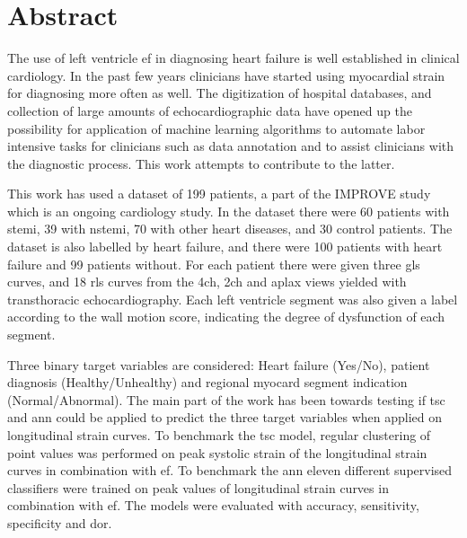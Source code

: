 \section*{Abstract}
%

The use of left ventricle \acrfull{ef} in diagnosing heart failure is well established in clinical cardiology. In the past few years clinicians have started using myocardial strain for diagnosing more often as well. The digitization of hospital databases, and collection of large amounts of echocardiographic data have opened up the possibility for application of machine learning algorithms to automate labor intensive tasks for clinicians such as data annotation and to assist clinicians with the diagnostic process. This work attempts to contribute to the latter. \bigskip

This work has used a dataset of 199 patients, a part of the IMPROVE study which is an ongoing cardiology study. In the dataset there were 60 patients with \acrlong{stemi}, 39 with \acrlong{nstemi}, 70 with other heart diseases, and 30 control patients. The dataset is also labelled by heart failure, and there were 100 patients with heart failure and 99 patients without. For each patient there were given three \acrlong{gls} curves, and 18 \acrlong{rls} curves from the \acrlong{4ch}, \acrlong{2ch} and \acrlong{aplax} views yielded with transthoracic echocardiography. Each left ventricle segment was also given a label according to the wall motion score, indicating the degree of dysfunction of each segment. \bigskip

Three binary target variables are considered: Heart failure (Yes/No), patient diagnosis (Healthy/Unhealthy) and regional myocard segment indication (Normal/Abnormal). The main part of the work has been towards testing if \acrfull{tsc} and \acrfull{ann} could be applied to predict the three target variables when applied on longitudinal strain curves. To benchmark the \acrshort{tsc} model, regular clustering of point values was performed on peak systolic strain of the longitudinal strain curves in combination with \acrshort{ef}. To benchmark the \acrfull{ann} eleven different supervised classifiers were trained on peak values of longitudinal strain curves in combination with \acrshort{ef}. The models were evaluated with accuracy, sensitivity, specificity and \acrfull{dor}. \bigskip

